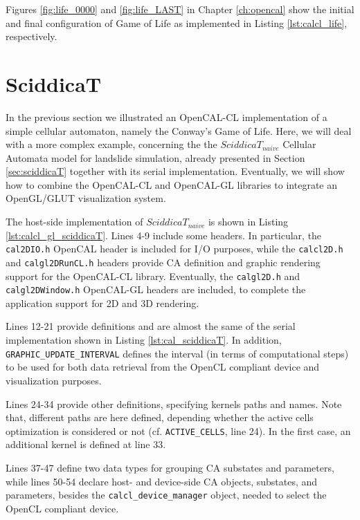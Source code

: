 Figures \ref{fig:life_0000} and \ref{fig:life_LAST} in Chapter
\ref{ch:opencal} show the initial and final configuration of Game of
Life as implemented in Listing \ref{lst:calcl_life}, respectively.


\section{SciddicaT}\label{sec:calcl_sciddicaT}
In the previous section we illustrated an OpenCAL-CL implementation of
a simple cellular automaton, namely the Conway’s Game of Life. Here,
we will deal with a more complex example, concerning the the
$SciddicaT_{naive}$ Cellular Automata model for landslide simulation,
already presented in Section \ref{sec:sciddicaT} together with its
serial implementation. Eventually, we will show how to combine the
OpenCAL-CL and OpenCAL-GL libraries to integrate an OpenGL/GLUT
visualization system.



The host-side implementation of $SciddicaT_{naive}$ is shown in
Listing \ref{lst:calcl_gl_sciddicaT}. Lines 4-9 include some
headers. In particular, the \verb'cal2DIO.h' OpenCAL header is
included for I/O purposes, while the \verb'calcl2D.h' and
\verb'calgl2DRunCL.h' headers provide CA definition and graphic
rendering support for the OpenCAL-CL library. Eventually, the
\verb'calgl2D.h' and \verb'calgl2DWindow.h' OpenCAL-GL headers are
included, to complete the application support for 2D and 3D rendering.

Lines 12-21 provide definitions and are almost the same of the
serial implementation shown in Listing \ref{lst:cal_sciddicaT}. In
addition, \verb'GRAPHIC_UPDATE_INTERVAL' defines the interval (in
terms of computational steps) to be used for both data retrieval from
the OpenCL compliant device and visualization purposes.

Lines 24-34 provide other definitions, specifying kernels paths and
names. Note that, different paths are here defined, depending whether
the active cells optimization is considered or not
(cf. \verb'ACTIVE_CELLS', line 24). In the first case, an additional
kernel is defined at line 33.

Lines 37-47 define two data types for grouping CA substates and
parameters, while lines 50-54 declare host- and device-side CA
objects, substates, and parameters, besides the
\verb'calcl_device_manager' object, needed to select the OpenCL
compliant device.

